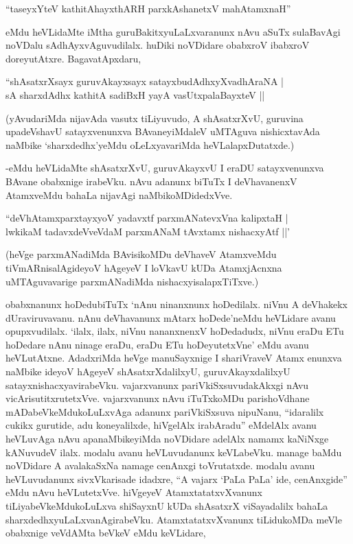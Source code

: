 \begin{shloka}
``taseyxYteV kathitAhayxthARH parxkAshanetxV mahAtamxnaH''
\end{shloka}

eMdu heVLidaMte iMtha guruBakitxyuLaLxvaranunx nAvu aSuTx sulaBavAgi noVDalu sAdhAyxvAguvudilalx. huDiki noVDidare obabxroV ibabxroV doreyutAtxre. BagavatApxdaru,

\begin{shloka}
``shAsatxrXsayx guruvAkayxsayx satayxbudAdhxyXvadhAraNA |\\
sA sharxdAdhx kathitA sadiBxH yayA vasUtxpalaBayxteV ||
\end{shloka}

(yAvudariMda nijavAda vasutx tiLiyuvudo, A shAsatxrXvU, guruvina upadeVshavU satayxvenunxva BAvaneyiMdaleV uMTAguva nishicxtavAda naMbike `sharxdedhx'yeMdu oLeLxyavariMda heVLalapxDutatxde.)

-eMdu heVLidaMte shAsatxrXvU, guruvAkayxvU I eraDU satayxvenunxva BAvane obabxnige irabeVku. nAvu adanunx biTuTx I deVhavanenxV AtamxveMdu bahaLa nijavAgi naMbikoMDidedxVve.

\begin{shloka}
``deVhAtamxparxtayxyoV yadavxtf parxmANatevxVna kalipxtaH |\\
lwkikaM tadavxdeVveVdaM parxmANaM tAvxtamx nishacxyAtf ||'
\end{shloka}

(heVge parxmANadiMda BAvisikoMDu deVhaveV AtamxveMdu tiVmARnisalAgideyoV hAgeyeV I loVkavU kUDa AtamxjAcnxna uMTAguvavarige parxmANadiMda nishacxyisalapxTiTxve.)

obabxnanunx hoDedubiTuTx `nAnu ninanxnunx hoDedilalx. niVnu A deVhakekx dUraviruvavanu. nAnu deVhavanunx mAtarx hoDede'neMdu heVLidare avanu opupxvudilalx. `ilalx, ilalx, niVnu nananxnenxV hoDedadudx, niVnu eraDu ETu hoDedare nAnu ninage eraDu, eraDu ETu hoDeyutetxVne' eMdu avanu heVLutAtxne. AdadxriMda heVge manuSayxnige I shariVraveV Atamx enunxva naMbike ideyoV hAgeyeV shAsatxrXdalilxyU, guruvAkayxdalilxyU satayxnishacxyavirabeVku. vajarxvanunx pariVkiSxsuvudakAkxgi nAvu vicArisutitxrutetxVve. vajarxvanunx nAvu iTuTxkoMDu parishoVdhane mADabeVkeMdukoLuLxvAga adanunx pariVkiSxsuva nipuNanu, ``idaralilx cukikx gurutide, adu koneyalilxde, hiVgelAlx irabAradu'' eMdelAlx avanu heVLuvAga nAvu apanaMbikeyiMda noVDidare adelAlx namamx kaNiNxge kANuvudeV ilalx. modalu avanu heVLuvudanunx keVLabeVku. manage baMdu noVDidare A avalakaSxNa namage cenAnxgi toVrutatxde. modalu avanu heVLuvudanunx sivxVkarisade idadxre, ``A vajarx `PaLa PaLa' ide, cenAnxgide'' eMdu nAvu heVLutetxVve. hiVgeyeV AtamxtatatxvXvanunx tiLiyabeVkeMdukoLuLxva shiSayxnU kUDa shAsatxrX viSayadalilx bahaLa sharxdedhxyuLaLxvanAgirabeVku. AtamxtatatxvXvanunx tiLidukoMDa meVle obabxnige veVdAMta beVkeV eMdu keVLidare,

